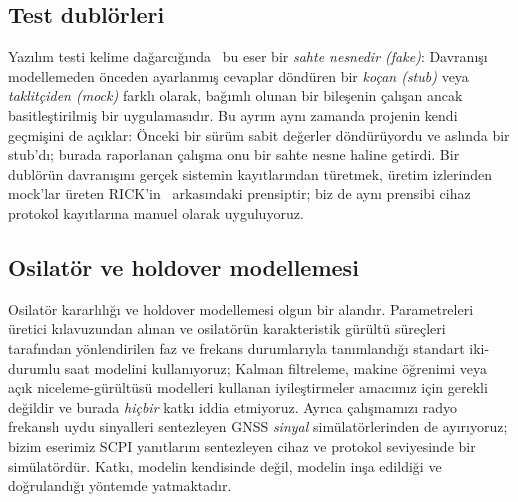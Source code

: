 \documentclass[9pt,twocolumn,a4paper]{extarticle}
\begin{document}
\subsection{Test dublörleri}
Yazılım testi kelime dağarcığında~\cite{meszaros2007xunit,fowler2007mocks} bu eser bir \emph{sahte nesnedir (fake)}: Davranışı modellemeden önceden ayarlanmış cevaplar döndüren bir \emph{koçan (stub)} veya \emph{taklitçiden (mock)} farklı olarak, bağımlı olunan bir bileşenin çalışan ancak basitleştirilmiş bir uygulamasıdır. Bu ayrım aynı zamanda projenin kendi geçmişini de açıklar: Önceki bir sürüm sabit değerler döndürüyordu ve aslında bir stub'dı; burada raporlanan çalışma onu bir sahte nesne haline getirdi. Bir dublörün davranışını gerçek sistemin kayıtlarından türetmek, üretim izlerinden mock'lar üreten RICK'in~\cite{tiwari2023rick} arkasındaki prensiptir; biz de aynı prensibi cihaz protokol kayıtlarına manuel olarak uyguluyoruz.

\subsection{Osilatör ve holdover modellemesi}
Osilatör kararlılığı ve holdover modellemesi olgun bir alandır. Parametreleri üretici kılavuzundan alınan ve osilatörün karakteristik gürültü süreçleri~\cite{zucca2005clock} tarafından yönlendirilen faz ve frekans durumlarıyla tanımlandığı standart iki-durumlu saat modelini kullanıyoruz; Kalman filtreleme, makine öğrenimi veya açık niceleme-gürültüsü modelleri kullanan iyileştirmeler amacımız için gerekli değildir ve burada \emph{hiçbir} katkı iddia etmiyoruz. Ayrıca çalışmamızı radyo frekanslı uydu sinyalleri sentezleyen GNSS \emph{sinyal} simülatörlerinden de ayırıyoruz; bizim eserimiz SCPI yanıtlarını sentezleyen cihaz ve protokol seviyesinde bir simülatördür. Katkı, modelin kendisinde değil, modelin inşa edildiği ve doğrulandığı yöntemde yatmaktadır.

\end{document}
